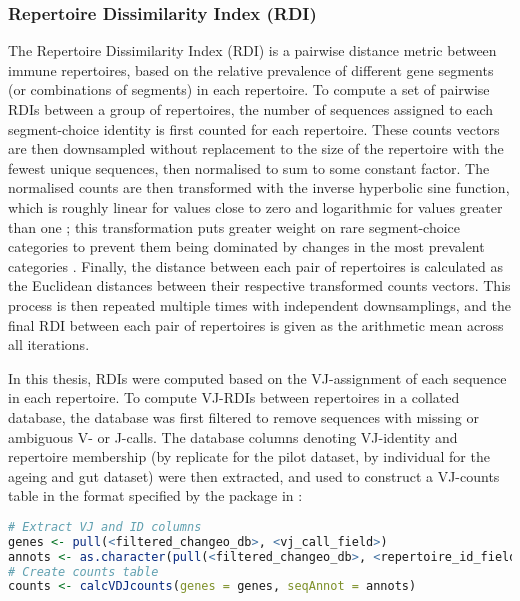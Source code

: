 \subsubsection{Repertoire Dissimilarity Index (RDI)}
\label{sec:methods_comp_igdownstream_rdi}

The Repertoire Dissimilarity Index (RDI) \parencite{bolen2017rdi} is a pairwise distance metric between immune repertoires, based on the relative prevalence of different gene segments (or combinations of segments) in each repertoire. To compute a set of pairwise RDIs between a group of repertoires, the number of sequences assigned to each segment-choice identity is first counted for each repertoire. These counts vectors are then downsampled without replacement to the size of the repertoire with the fewest unique sequences, then normalised to sum to some constant factor. The normalised counts are then transformed with the inverse hyperbolic sine function, which is roughly linear for values close to zero and logarithmic for values greater than one \parencite{bolen2017rdi}; this transformation puts greater weight on rare segment-choice categories to prevent them being dominated by changes in the most prevalent categories \parencite{bolen2017rdi}. Finally, the distance between each pair of repertoires is calculated as the Euclidean distances between their respective transformed counts vectors. This process is then repeated multiple times with independent downsamplings, and the final RDI between each pair of repertoires is given as the arithmetic mean across all iterations.

In this thesis, RDIs were computed based on the VJ-assignment of each sequence in each repertoire. To compute VJ-RDIs between repertoires in a collated  database, the database was first filtered to remove sequences with missing or ambiguous V- or J-calls. The database columns denoting VJ-identity and repertoire membership (by replicate for the pilot dataset, by individual for the ageing and gut dataset) were then extracted, and used to construct a VJ-counts table in the format specified by the  package \parencite{bolen2017rdi} in :

\begin{lstlisting}[language=R]
# Extract VJ and ID columns
genes <- pull(<filtered_changeo_db>, <vj_call_field>)
annots <- as.character(pull(<filtered_changeo_db>, <repertoire_id_field>))
# Create counts table
counts <- calcVDJcounts(genes = genes, seqAnnot = annots)
\end{lstlisting}

